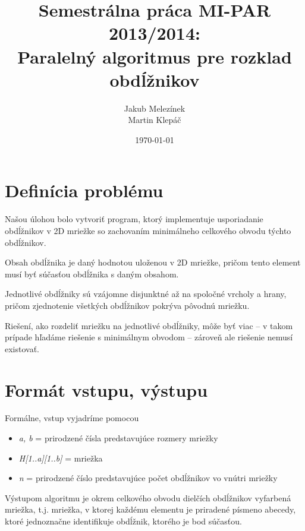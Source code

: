 \documentclass[slovak]{article}
\begin{document}
\title{Semestrálna práca MI-PAR 2013/2014: \\[5mm] Paralelný algoritmus pre rozklad obdĺžnikov}
\author{Jakub Melezínek \\[2mm]Martin Klepáč}
\date{\today}

\maketitle

\section{Definícia problému}

Našou úlohou bolo vytvoriť program, ktorý implementuje usporiadanie obdĺžnikov v 2D mriežke so zachovaním minimálneho celkového obvodu týchto obdĺžnikov.

Obsah obdĺžnika je daný hodnotou uloženou v 2D mriežke, pričom tento element musí byť súčasťou obdĺžnika s daným obsahom.

Jednotlivé obdĺžniky sú vzájomne disjunktné až na spoločné vrcholy a hrany, pričom zjednotenie všetkých obdĺžnikov pokrýva pôvodnú mriežku.

Riešení, ako rozdeliť mriežku na jednotlivé obdĺžniky, môže byť viac -- v takom prípade hľadáme riešenie s minimálnym obvodom -- zároveň ale riešenie nemusí existovať.


\section{Formát vstupu, výstupu}

Formálne, vstup vyjadríme pomocou

\begin{itemize}

\item \emph{a, b} = prirodzené čísla predstavujúce rozmery mriežky

\item \emph{H[1..a][1..b]} = mriežka

\item \emph{n} = prirodzené číslo predstavujúce počet obdĺžnikov vo vnútri mriežky

\end{itemize}

Výstupom algoritmu je okrem celkového obvodu dielčích obdĺžnikov vyfarbená mriežka, t.j. mriežka, v ktorej každému elementu je priradené písmeno abecedy, ktoré jednoznačne identifikuje obdĺžnik, ktorého je bod súčasťou.
\end{document}
